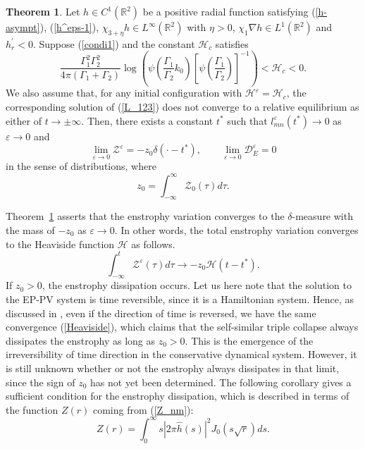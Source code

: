 \documentclass{article}
\theoremstyle{definition}
\newtheorem{theorem}{Theorem}[section]
\begin{document}
\begin{theorem}
Let $h \in C^1(\mathbb{R}^2)$ be a positive radial function satisfying (\ref{h-asympt}), (\ref{h^eps-1}), $\chi_{3+\eta} h \in L^\infty(\mathbb{R}^2)$ with $\eta > 0$, $\chi_1 \nabla h \in L^1(\mathbb{R}^2)$ and $h_r^\prime < 0$. Suppose (\ref{condi1}) and the constant $\mathscr{H}_c$ satisfies
\begin{equation}
\frac{\Gamma_1^2 \Gamma_2^2}{4\pi(\Gamma_1 + \Gamma_2)} \log\left( \psi\left( \frac{\Gamma_1}{\Gamma_2}k_0 \right) \left[ \psi\left( \frac{\Gamma_1}{\Gamma_2} \right) \right]^{-1} \right) < \mathscr{H}_c < 0.  \label{H-Range}
\end{equation}
We also assume that, for any initial configuration with $\mathscr{H}^\varepsilon = \mathscr{H}_c$, the corresponding solution of (\ref{L_123})  does not converge to a relative equilibrium as either of $t \rightarrow \pm \infty$. Then, there exists a constant $t^\ast$ such that $l^\varepsilon_{mn}(t^\ast) \rightarrow 0$ as  $\varepsilon \rightarrow 0$ and
\begin{equation*}
\lim_{\varepsilon \rightarrow 0} \mathscr{Z}^\varepsilon = - z_0 \delta(\cdot - t^\ast) , \qquad \lim_{\varepsilon \rightarrow 0} \mathscr{D}_E^\varepsilon = 0
\end{equation*}
in the sense of distributions, where  
\begin{equation}
z_0 = \int_{-\infty}^\infty \mathscr{Z}_0(\tau) d\tau. 
\label{z_0}
\end{equation} 
\label{thm-dissipation}
\end{theorem} 



Theorem~\ref{thm-dissipation} asserts that the enstrophy variation converges to the $\delta$-measure with the mass of $- z_0$ as $\varepsilon \rightarrow 0$. In other words, the total enstrophy variation converges to
the Heaviside function $\mathcal{H}$ as follows.
\begin{equation}
\int_{-\infty}^t \mathscr{Z}^\varepsilon(\tau) d\tau \longrightarrow -z_0 \mathcal{H}(t-t^\ast).
\label{Heaviside}
\end{equation}
If $z_0>0$, the enstrophy dissipation occurs. Let us here note that the solution to the EP-PV system is time reversible, since it
is a Hamiltonian  system. Hence,  as discussed in \cite{G.2}, even if the direction of time is reversed, we have  the same convergence (\ref{Heaviside}),
which claims that the self-similar triple collapse always dissipates the enstrophy as long as $z_0>0$.
This is the emergence of the irreversibility of time direction in the conservative dynamical system.  However, it is still unknown 
whether or not the enstrophy always dissipates in that limit, since the sign of $z_0$ has not yet been determined. 
The following corollary  gives a sufficient condition for the enstrophy dissipation, which is described in terms of the function $Z(r)$ 
coming from (\ref{Z_nm}):
\begin{equation}
Z(r) = \int_0^\infty s \left\vert 2\pi\widehat{h}(s) \right\vert^2  J_0 \left( s \sqrt{r} \right) ds. \label{Z}
\end{equation}
\end{document}
